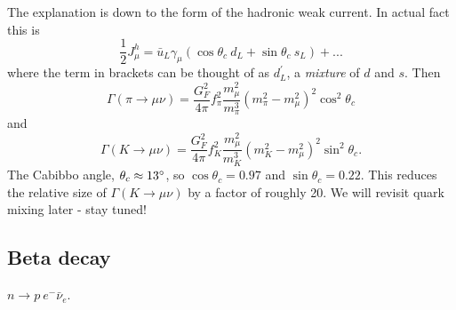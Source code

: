 \documentclass[a4paper,12pt]{article}
\begin{document}
The explanation is down to the form of the hadronic weak current. In actual fact this is
\begin{equation}
 \frac{1}{2}J_\mu^h = \bar{u}_L\gamma_\mu(\cos\theta_c\ d_L + \sin\theta_c\ s_L) + ... 
\end{equation}
where the term in brackets can be thought of as $d_L^\prime$, a \textit{mixture} of $d$ and $s$. Then 
\begin{equation}
    \Gamma(\pi \to \mu\nu) = \frac{G_F^2}{4\pi} f_\pi^2 \frac{m_\mu^2}{m_\pi^3}(m_\pi^2 - m_\mu^2)^2 \cos^2\theta_c
\end{equation} 
and
\begin{equation}
    \Gamma(K \to \mu\nu) = \frac{G_F^2}{4\pi} f_K^2 \frac{m_\mu^2}{m_K^3}(m_K^2 - m_\mu^2)^2 \sin^2\theta_c.
\end{equation} 
The Cabibbo angle, $\theta_c \approx 13\degree$, so $\cos\theta_c = 0.97$ and $\sin\theta_c = 0.22$. This reduces the relative size of $\Gamma(K \to \mu\nu)$ by a factor of roughly 20. We will revisit quark mixing later - stay tuned!
%
\subsection{Beta decay}
$n \to p\ e^- \bar{\nu}_e$.
\newline
\end{document}
